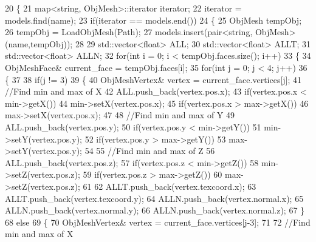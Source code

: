 \begin{DoxyCode}
20 \{
21     map<string, ObjMesh>::iterator iterator;
22     iterator = models.find(name);
23     \textcolor{keywordflow}{if}(iterator == models.end())
24     \{
25         ObjMesh tempObj;
26         tempObj = LoadObjMesh(Path);
27         models.insert(pair<string, ObjMesh>(name,tempObj));
28 
29         std::vector<float> ALL;
30         std::vector<float> ALLT;
31         std::vector<float> ALLN;
32         \textcolor{keywordflow}{for}(\textcolor{keywordtype}{int} i = 0; i < tempObj.faces.size(); i++)
33         \{
34             ObjMeshFace& current\_face = tempObj.faces[i];
35             \textcolor{keywordflow}{for}(\textcolor{keywordtype}{int} j = 0; j < 4; j++)
36             \{
37         
38                 \textcolor{keywordflow}{if}(j != 3)
39                 \{
40                     ObjMeshVertex& vertex = current\_face.vertices[j];
41                     \textcolor{comment}{//Find min and max of X}
42                     ALL.push\_back(vertex.pos.x);
43                     \textcolor{keywordflow}{if}(vertex.pos.x < min->getX())
44                         min->setX(vertex.pos.x);
45                     \textcolor{keywordflow}{if}(vertex.pos.x > max->getX())
46                         max->setX(vertex.pos.x);
47                     
48                     \textcolor{comment}{//Find min and max of Y}
49                     ALL.push\_back(vertex.pos.y);
50                     \textcolor{keywordflow}{if}(vertex.pos.y < min->getY())
51                         min->setY(vertex.pos.y);
52                     \textcolor{keywordflow}{if}(vertex.pos.y > max->getY())
53                         max->setY(vertex.pos.y);
54 
55                     \textcolor{comment}{//Find min and max of Z}
56                     ALL.push\_back(vertex.pos.z);
57                     \textcolor{keywordflow}{if}(vertex.pos.z < min->getZ())
58                         min->setZ(vertex.pos.z);
59                     \textcolor{keywordflow}{if}(vertex.pos.z > max->getZ())
60                         max->setZ(vertex.pos.z);
61 
62                     ALLT.push\_back(vertex.texcoord.x);
63                     ALLT.push\_back(vertex.texcoord.y);
64                     ALLN.push\_back(vertex.normal.x);
65                     ALLN.push\_back(vertex.normal.y);
66                     ALLN.push\_back(vertex.normal.z);
67                 \}
68                 \textcolor{keywordflow}{else}
69                 \{
70                     ObjMeshVertex& vertex = current\_face.vertices[j-3];
71                     
72                     \textcolor{comment}{//Find min and max of X}

\end{DoxyCode}
